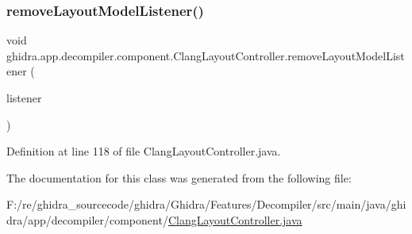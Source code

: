\subsubsection{\texorpdfstring{removeLayoutModelListener()}{removeLayoutModelListener()}}
{\footnotesize\ttfamily void ghidra.\+app.\+decompiler.\+component.\+Clang\+Layout\+Controller.\+remove\+Layout\+Model\+Listener (\begin{DoxyParamCaption}\item[{Layout\+Model\+Listener}]{listener }\end{DoxyParamCaption})\hspace{0.3cm}{\ttfamily [inline]}}



Definition at line 118 of file Clang\+Layout\+Controller.\+java.



The documentation for this class was generated from the following file\+:\begin{DoxyCompactItemize}
\item 
F\+:/re/ghidra\+\_\+sourcecode/ghidra/\+Ghidra/\+Features/\+Decompiler/src/main/java/ghidra/app/decompiler/component/\mbox{\hyperlink{_clang_layout_controller_8java}{Clang\+Layout\+Controller.\+java}}\end{DoxyCompactItemize}
